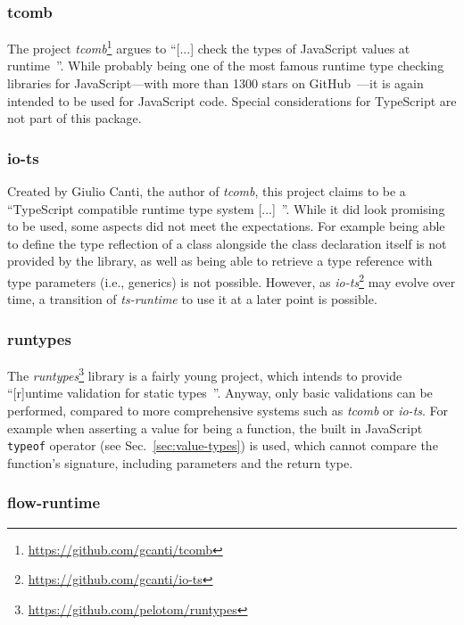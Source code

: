 \subsubsection{tcomb}

The project \emph{tcomb}\footnote{\url{https://github.com/gcanti/tcomb}} argues to ``[...] check the types of JavaScript values at runtime~\cite{RuntimeTypeSystem:tcomb}''. While probably being one of the most famous runtime type checking libraries for JavaScript---with more than 1300 stars on GitHub~\cite{RuntimeTypeSystem:tcomb}---it is again intended to be used for JavaScript code. Special considerations for TypeScript are not part of this package.

\subsubsection{io-ts}

Created by Giulio Canti, the author of \emph{tcomb}, this project claims to be a ``TypeScript compatible runtime type system [...]~\cite{RuntimeTypeSystem:io-ts}''. While it did look promising to be used, some aspects did not meet the expectations. For example being able to define the type reflection of a class alongside the class declaration itself is not provided by the library, as well as being able to retrieve a type reference with type parameters (i.e., generics) is not possible. However, as \emph{io-ts}\footnote{\url{https://github.com/gcanti/io-ts}} may evolve over time, a transition of \emph{ts-runtime} to use it at a later point is possible.

\subsubsection{runtypes}

The \emph{runtypes}\footnote{\url{https://github.com/pelotom/runtypes}} library is a fairly young project, which intends to provide ``[r]untime validation for static types~\cite{RuntimeTypeSystem:runtypes}''. Anyway, only basic validations can be performed, compared to more comprehensive systems such as \emph{tcomb} or \emph{io-ts}. For example when asserting a value for being a function, the built in JavaScript \texttt{typeof} operator (see Sec.~\ref{sec:value-types}) is used, which cannot compare the function's signature, including parameters and the return type.

\subsubsection{flow-runtime}

